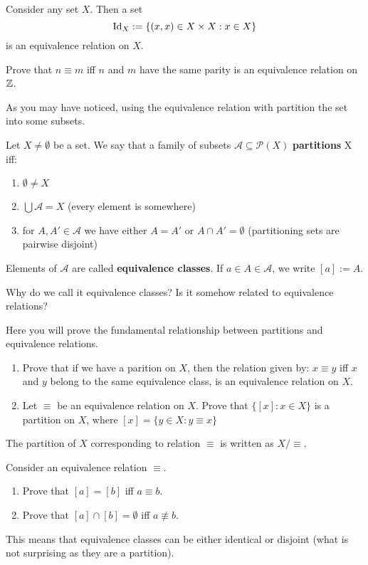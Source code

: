 \begin{example}
  Consider any set $X$. Then a set $$\text{Id}_X := \{(x,x)\in X\times X : x\in X\}$$
  is an equivalence relation on $X$.
\end{example}

\begin{exercise}
  Prove that $n\equiv m$ iff $n$ and $m$ have the same parity is an equivalence relation on $\mathbb Z$.
\end{exercise}

As you may have noticed, using the equivalence relation with partition the set into some subsets.

\begin{definition}
  Let $X\neq \emptyset$ be a set. We say that a family of subsets $\mathcal A\subseteq \mathcal P(X)$ \textbf{partitions} X iff:
  \begin{enumerate}
    \item $\emptyset \neq X$
    \item $\bigcup \mathcal A=X$ (every element is somewhere)
    \item for $A,A'\in \mathcal A$ we have either $A=A'$ or $A\cap A'=\emptyset$ (partitioning sets are pairwise disjoint)
  \end{enumerate}
  Elements of $\mathcal A$ are called \textbf{equivalence classes}. If $a\in A\in\mathcal A$, we write $[a]:=A$.
\end{definition}

Why do we call it equivalence classes? Is it somehow related to equivalence relations?

\begin{exercise}
  Here you will prove the fundamental relationship between partitions and equivalence relations.
  \begin{enumerate}
    \item Prove that if we have a parition on $X$, then the relation given by: $x\equiv y$ iff $x$ and $y$ belong to the same equivalence class, is an equivalence relation on $X$.
    \item Let $\equiv$ be an equivalence relation on $X$. Prove that $\{[x] : x\in X\}$ is a partition on $X$, where $[x]=\{y\in X : y\equiv x\}$
  \end{enumerate}
  The partition of $X$ corresponding to relation $\equiv$ is written as $X/\equiv.$
\end{exercise}

\begin{exercise}
  Consider an equivalence relation $\equiv$.
  \begin{enumerate}
    \item Prove that $[a]=[b]$ iff $a\equiv b$.
    \item Prove that $[a]\cap [b]=\emptyset$ iff $a\not\equiv b$.
  \end{enumerate}
  This means that equivalence classes can be either identical or disjoint (what is not surprising as they are a partition).
\end{exercise}

